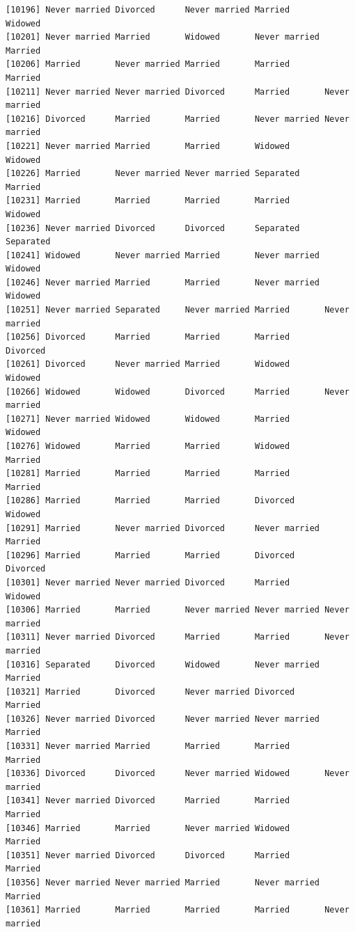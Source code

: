 \documentclass[
  letterpaper,
  DIV=11,
  numbers=noendperiod,
  oneside]{scrartcl}
\begin{document}
\begin{verbatim}
[10196] Never married Divorced      Never married Married       Widowed      
[10201] Never married Married       Widowed       Never married Married      
[10206] Married       Never married Married       Married       Married      
[10211] Never married Never married Divorced      Married       Never married
[10216] Divorced      Married       Married       Never married Never married
[10221] Never married Married       Married       Widowed       Widowed      
[10226] Married       Never married Never married Separated     Married      
[10231] Married       Married       Married       Married       Widowed      
[10236] Never married Divorced      Divorced      Separated     Separated    
[10241] Widowed       Never married Married       Never married Widowed      
[10246] Never married Married       Married       Never married Widowed      
[10251] Never married Separated     Never married Married       Never married
[10256] Divorced      Married       Married       Married       Divorced     
[10261] Divorced      Never married Married       Widowed       Widowed      
[10266] Widowed       Widowed       Divorced      Married       Never married
[10271] Never married Widowed       Widowed       Married       Widowed      
[10276] Widowed       Married       Married       Widowed       Married      
[10281] Married       Married       Married       Married       Married      
[10286] Married       Married       Married       Divorced      Widowed      
[10291] Married       Never married Divorced      Never married Married      
[10296] Married       Married       Married       Divorced      Divorced     
[10301] Never married Never married Divorced      Married       Widowed      
[10306] Married       Married       Never married Never married Never married
[10311] Never married Divorced      Married       Married       Never married
[10316] Separated     Divorced      Widowed       Never married Married      
[10321] Married       Divorced      Never married Divorced      Married      
[10326] Never married Divorced      Never married Never married Married      
[10331] Never married Married       Married       Married       Married      
[10336] Divorced      Divorced      Never married Widowed       Never married
[10341] Never married Divorced      Married       Married       Married      
[10346] Married       Married       Never married Widowed       Married      
[10351] Never married Divorced      Divorced      Married       Married      
[10356] Never married Never married Married       Never married Married      
[10361] Married       Married       Married       Married       Never married

\end{verbatim}
\end{document}
